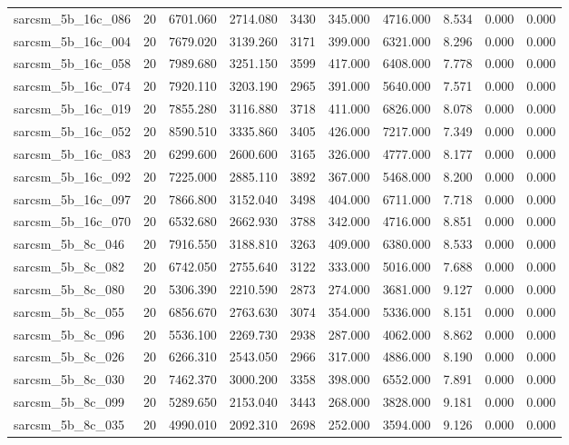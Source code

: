 \begin{tabular}{lrrrrrrrrr}
sarcsm\_5b\_16c\_086 & 20 & 6701.060 & 2714.080 & 3430 & 345.000 & 4716.000 & 8.534 & 0.000 & 0.000 \\
sarcsm\_5b\_16c\_004 & 20 & 7679.020 & 3139.260 & 3171 & 399.000 & 6321.000 & 8.296 & 0.000 & 0.000 \\
sarcsm\_5b\_16c\_058 & 20 & 7989.680 & 3251.150 & 3599 & 417.000 & 6408.000 & 7.778 & 0.000 & 0.000 \\
sarcsm\_5b\_16c\_074 & 20 & 7920.110 & 3203.190 & 2965 & 391.000 & 5640.000 & 7.571 & 0.000 & 0.000 \\
sarcsm\_5b\_16c\_019 & 20 & 7855.280 & 3116.880 & 3718 & 411.000 & 6826.000 & 8.078 & 0.000 & 0.000 \\
sarcsm\_5b\_16c\_052 & 20 & 8590.510 & 3335.860 & 3405 & 426.000 & 7217.000 & 7.349 & 0.000 & 0.000 \\
sarcsm\_5b\_16c\_083 & 20 & 6299.600 & 2600.600 & 3165 & 326.000 & 4777.000 & 8.177 & 0.000 & 0.000 \\
sarcsm\_5b\_16c\_092 & 20 & 7225.000 & 2885.110 & 3892 & 367.000 & 5468.000 & 8.200 & 0.000 & 0.000 \\
sarcsm\_5b\_16c\_097 & 20 & 7866.800 & 3152.040 & 3498 & 404.000 & 6711.000 & 7.718 & 0.000 & 0.000 \\
sarcsm\_5b\_16c\_070 & 20 & 6532.680 & 2662.930 & 3788 & 342.000 & 4716.000 & 8.851 & 0.000 & 0.000 \\
sarcsm\_5b\_8c\_046 & 20 & 7916.550 & 3188.810 & 3263 & 409.000 & 6380.000 & 8.533 & 0.000 & 0.000 \\
sarcsm\_5b\_8c\_082 & 20 & 6742.050 & 2755.640 & 3122 & 333.000 & 5016.000 & 7.688 & 0.000 & 0.000 \\
sarcsm\_5b\_8c\_080 & 20 & 5306.390 & 2210.590 & 2873 & 274.000 & 3681.000 & 9.127 & 0.000 & 0.000 \\
sarcsm\_5b\_8c\_055 & 20 & 6856.670 & 2763.630 & 3074 & 354.000 & 5336.000 & 8.151 & 0.000 & 0.000 \\
sarcsm\_5b\_8c\_096 & 20 & 5536.100 & 2269.730 & 2938 & 287.000 & 4062.000 & 8.862 & 0.000 & 0.000 \\
sarcsm\_5b\_8c\_026 & 20 & 6266.310 & 2543.050 & 2966 & 317.000 & 4886.000 & 8.190 & 0.000 & 0.000 \\
sarcsm\_5b\_8c\_030 & 20 & 7462.370 & 3000.200 & 3358 & 398.000 & 6552.000 & 7.891 & 0.000 & 0.000 \\
sarcsm\_5b\_8c\_099 & 20 & 5289.650 & 2153.040 & 3443 & 268.000 & 3828.000 & 9.181 & 0.000 & 0.000 \\
sarcsm\_5b\_8c\_035 & 20 & 4990.010 & 2092.310 & 2698 & 252.000 & 3594.000 & 9.126 & 0.000 & 0.000 \\

\end{tabular}
